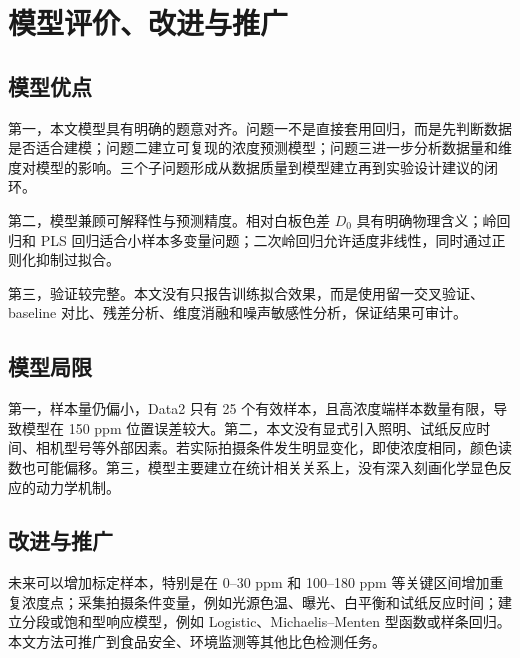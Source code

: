 \documentclass[UTF8,a4paper,12pt]{ctexart}
\begin{document}
\section{模型评价、改进与推广}
\subsection{模型优点}
第一，本文模型具有明确的题意对齐。问题一不是直接套用回归，而是先判断数据是否适合建模；问题二建立可复现的浓度预测模型；问题三进一步分析数据量和维度对模型的影响。三个子问题形成从数据质量到模型建立再到实验设计建议的闭环。

第二，模型兼顾可解释性与预测精度。相对白板色差 $D_0$ 具有明确物理含义；岭回归和 PLS 回归适合小样本多变量问题；二次岭回归允许适度非线性，同时通过正则化抑制过拟合。

第三，验证较完整。本文没有只报告训练拟合效果，而是使用留一交叉验证、baseline 对比、残差分析、维度消融和噪声敏感性分析，保证结果可审计。
\subsection{模型局限}
第一，样本量仍偏小，Data2 只有 25 个有效样本，且高浓度端样本数量有限，导致模型在 150 ppm 位置误差较大。第二，本文没有显式引入照明、试纸反应时间、相机型号等外部因素。若实际拍摄条件发生明显变化，即使浓度相同，颜色读数也可能偏移。第三，模型主要建立在统计相关关系上，没有深入刻画化学显色反应的动力学机制。
\subsection{改进与推广}
未来可以增加标定样本，特别是在 0--30 ppm 和 100--180 ppm 等关键区间增加重复浓度点；采集拍摄条件变量，例如光源色温、曝光、白平衡和试纸反应时间；建立分段或饱和型响应模型，例如 Logistic、Michaelis--Menten 型函数或样条回归。本文方法可推广到食品安全、环境监测等其他比色检测任务。
\end{document}
